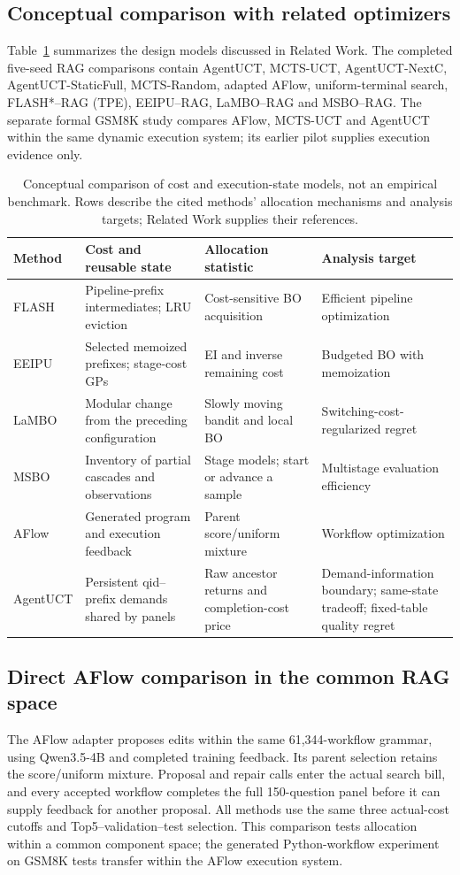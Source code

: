 \subsection{Conceptual comparison with related optimizers}
Table~\ref{tab:related} summarizes the design models discussed in Related Work.
The completed five-seed RAG comparisons contain AgentUCT, MCTS-UCT,
AgentUCT-NextC, AgentUCT-StaticFull, MCTS-Random, adapted AFlow,
uniform-terminal search, FLASH*--RAG (TPE), EEIPU--RAG, LaMBO--RAG and
MSBO--RAG. The separate formal GSM8K study
compares AFlow, MCTS-UCT and AgentUCT within the same dynamic execution system;
its earlier pilot supplies execution evidence only.
\begin{table}[t]
\centering\small
\caption{Conceptual comparison of cost and execution-state models, not an
empirical benchmark. Rows describe the cited methods' allocation mechanisms
and analysis targets; Related Work supplies their references.}
\label{tab:related}
\begin{tabularx}{\textwidth}{@{}l XXX@{}}
\toprule
Method & Cost and reusable state & Allocation statistic & Analysis target\\
\midrule
FLASH & Pipeline-prefix intermediates; LRU eviction & Cost-sensitive BO acquisition & Efficient pipeline optimization\\
EEIPU & Selected memoized prefixes; stage-cost GPs & EI and inverse remaining cost & Budgeted BO with memoization\\
LaMBO & Modular change from the preceding configuration & Slowly moving bandit and local BO & Switching-cost-regularized regret\\
MSBO & Inventory of partial cascades and observations & Stage models; start or advance a sample & Multistage evaluation efficiency\\
AFlow & Generated program and execution feedback & Parent score/uniform mixture & Workflow optimization\\
AgentUCT & Persistent qid--prefix demands shared by panels & Raw ancestor returns and completion-cost price & Demand-information boundary; same-state tradeoff; fixed-table quality regret\\
\bottomrule
\end{tabularx}
\end{table}

\subsection{Direct AFlow comparison in the common RAG space}
The AFlow adapter proposes edits within the same 61,344-workflow grammar,
using Qwen3.5-4B and completed training feedback. Its parent selection retains
the score/uniform mixture. Proposal and repair calls enter the actual search
bill, and every accepted workflow completes the full 150-question panel
before it can supply feedback for another proposal. All methods use the same
three actual-cost cutoffs and Top5--validation--test selection. This comparison
tests allocation within a common component space; the generated Python-workflow
experiment on GSM8K tests transfer within the AFlow execution system.

